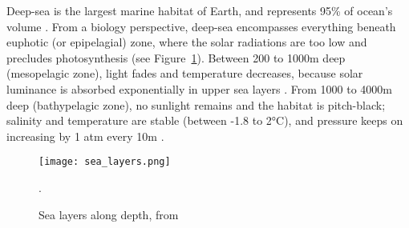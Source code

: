 




Deep-sea is the largest marine habitat of Earth, and represents 95\% of ocean's volume \citep{danovaro2017,salazar2016,webb2010}. From a biology perspective, deep-sea encompasses everything beneath euphotic (or epipelagial) zone, where the solar radiations are too low and precludes photosynthesis \citep{baker2020,danovaro2017,salazar2016} (see Figure~\ref{fig:dsl}). Between 200 to 1000m deep (mesopelagic zone), light fades and temperature decreases, because solar luminance is absorbed exponentially in upper sea layers \citep{reynolds2001}. From 1000 to 4000m deep (bathypelagic zone), no sunlight remains and the habitat is pitch-black; salinity and temperature are stable (between -1.8 to 2°C), and pressure keeps on increasing by 1 atm every 10m \citep{danovaro2017}. 

\begin{figure} [!htbp]
	\begin{center}
		\texttt{[image: sea\_layers.png]}
	\end{center}
	\caption{Sea layers along depth, from \citep{fig_deep_sea}}.
	\label{fig:dsl}
\end{figure}

